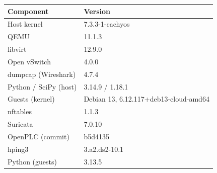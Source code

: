\begin{tabular}{ll}
\toprule
Component & Version\\
\midrule
Host kernel & 7.3.3-1-cachyos\\
QEMU & 11.1.3\\
libvirt & 12.9.0\\
Open vSwitch & 4.0.0\\
dumpcap (Wireshark) & 4.7.4\\
Python / SciPy (host) & 3.14.9 / 1.18.1\\
Guests (kernel) & Debian 13, 6.12.117+deb13-cloud-amd64\\
nftables & 1.1.3\\
Suricata & 7.0.10\\
OpenPLC (commit) & b5d4135\\
hping3 & 3.a2.ds2-10.1\\
Python (guests) & 3.13.5\\
\bottomrule
\end{tabular}

